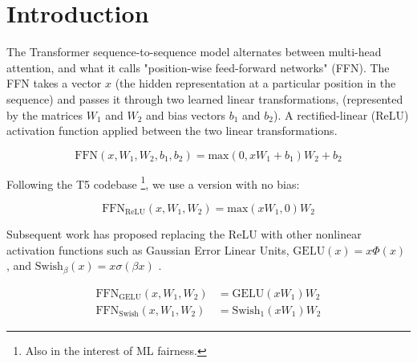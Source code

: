 \documentclass{article}
\title{\vspace{-2em}
  \hrule height 4pt
  \vskip 0.25in
  \vskip -\parskip
  \textbf{
  GLU Variants Improve Transformer 
  }
  \vskip 0.2in
  \vskip -\parskip
  \hrule height 1pt
  \vskip 0.09in}
\author{Noam Shazeer \\ Google \\ noam@google.com}
\begin{document}
\maketitle

\begin{abstract}
Gated Linear Units \citep{dauphin2016} consist of the component-wise product of two linear projections, one of which is first passed through a sigmoid function.  Variations on GLU are possible, using different nonlinear (or even linear) functions in place of sigmoid.  We test these variants in the feed-forward sublayers of the Transformer \citep{Vas17} sequence-to-sequence model, and find that some of them yield quality improvements over the typically-used ReLU or GELU activations.
\end{abstract}

\section{Introduction}
The Transformer \citep{Vas17} sequence-to-sequence model alternates between multi-head attention, and what it calls "position-wise feed-forward networks" (FFN).  The FFN takes a vector $x$ (the hidden representation at a particular position in the sequence) and passes it through two learned linear transformations, (represented by the matrices $W_1$ and $W_2$ and bias vectors $b_1$ and $b_2$).  A rectified-linear (ReLU) \citep{glorot2011deep} activation function applied between the two linear transformations.

\begin{equation}
\textrm{FFN}(x, W_1, W_2, b_1, b_2) = \textrm{max}(0, xW_1 + b_1)W_2 + b_2
\end{equation}

Following the T5 codebase \citep{raffel2019exploring} \footnote{Also in the interest of ML fairness.}, we use a version with no bias:

\begin{equation}
\textrm{FFN}_\textrm{ReLU}(x, W_1, W_2) = \textrm{max}(xW_1, 0)W_2
\end{equation}

Subsequent work has proposed replacing the ReLU with other nonlinear activation functions such as Gaussian Error Linear Units, $\textrm{GELU}(x)=x\Phi(x)$ \citep{hendrycks2016}, and $\textrm{Swish}_\beta(x)=x\sigma(\beta x)$ \citep{ramachandran2017searching}.

\begin{equation}
\begin{split}
\textrm{FFN}_\textrm{GELU}(x, W_1, W_2) & = \textrm{GELU}(xW_1)W_2 \\
\textrm{FFN}_\textrm{Swish}(x, W_1, W_2) & = \textrm{Swish}_1(xW_1)W_2
\end{split}
\end{equation}
\end{document}

